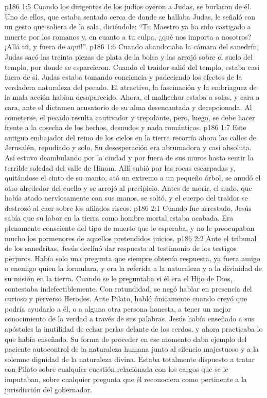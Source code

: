 \vs p186 1:5 Cuando los dirigentes de los judíos oyeron a Judas, se burlaron de él. Uno de ellos, que estaba sentado cerca de donde se hallaba Judas, le señaló con un gesto que saliera de la sala, diciéndole: “Tu Maestro ya ha sido castigado a muerte por los romanos y, en cuanto a tu culpa, ¿qué nos importa a nosotros? ¡Allá tú, y fuera de aquí!”.
\vs p186 1:6 Cuando abandonaba la cámara del sanedrín, Judas sacó las treinta piezas de plata de la bolsa y las arrojó sobre el suelo del templo, por donde se esparcieron. Cuando el traidor salió del templo, estaba casi fuera de sí. Judas estaba tomando conciencia y padeciendo los efectos de la verdadera naturaleza del pecado. El atractivo, la fascinación y la embriaguez de la mala acción habían desaparecido. Ahora, el malhechor estaba a solas, y cara a cara, ante el dictamen acusatorio de su alma desencantada y decepcionada. Al cometerse, el pecado resulta cautivador y trepidante, pero, luego, se debe hacer frente a la cosecha de los hechos, desnudos y nada románticos.
\vs p186 1:7 Este antiguo embajador del reino de los cielos en la tierra recorría ahora las calles de Jerusalén, repudiado y solo. Su desesperación era abrumadora y casi absoluta. Así estuvo deambulando por la ciudad y por fuera de sus muros hasta sentir la terrible soledad del valle de Hinom. Allí subió por las rocas escarpadas y, quitándose el cinto de su manto, ató un extremo a un pequeño árbol, se anudó el otro alrededor del cuello y se arrojó al precipicio. Antes de morir, el nudo, que había atado nerviosamente con sus manos, se soltó, y el cuerpo del traidor se destrozó al caer sobre los afilados riscos.
\vs p186 2:1 Cuando fue arrestado, Jesús sabía que su labor en la tierra como hombre mortal estaba acabada. Era plenamente consciente del tipo de muerte que le esperaba, y no le preocupaban mucho los pormenores de aquellos pretendidos juicios.
\vs p186 2:2 Ante el tribunal de los sanedritas, Jesús declinó dar respuesta al testimonio de los testigos perjuros. Había solo una pregunta que siempre obtenía respuesta, ya fuera amigo o enemigo quien la formulara, y era la referida a la naturaleza y a la divinidad de su misión en la tierra. Cuando se le preguntaba si él era el Hijo de Dios, contestaba indefectiblemente. Con rotundidad, se negó hablar en presencia del curioso y perverso Herodes. Ante Pilato, habló únicamente cuando creyó que podría ayudarlo a él, o a alguna otra persona honesta, a tener un mejor conocimiento de la verdad a través de sus palabras. Jesús había enseñado a sus apóstoles la inutilidad de echar perlas delante de los cerdos, y ahora practicaba lo que había enseñado. Su forma de proceder en ese momento daba ejemplo del paciente autocontrol de la naturaleza humana junto al silencio majestuoso y a la solemne dignidad de la naturaleza divina. Estaba totalmente dispuesto a tratar con Pilato sobre cualquier cuestión relacionada con los cargos que se le imputaban, sobre cualquier pregunta que él reconociera como pertinente a la jurisdicción del gobernador.
